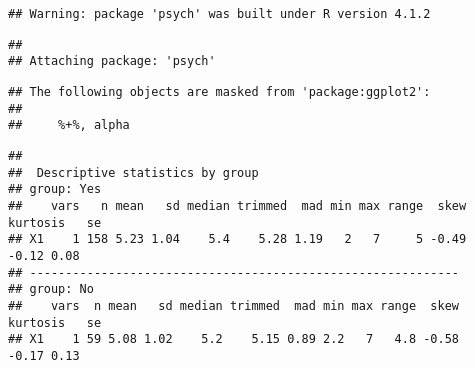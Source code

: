 \documentclass[
]{article}
\newenvironment{Shaded}{\begin{snugshade}}{\end{snugshade}}
\newcommand{\AttributeTok}[1]{\textcolor[rgb]{0.77,0.63,0.00}{#1}}
\newcommand{\CommentTok}[1]{\textcolor[rgb]{0.56,0.35,0.01}{\textit{#1}}}
\newcommand{\DecValTok}[1]{\textcolor[rgb]{0.00,0.00,0.81}{#1}}
\newcommand{\FunctionTok}[1]{\textcolor[rgb]{0.00,0.00,0.00}{#1}}
\newcommand{\NormalTok}[1]{#1}
\newcommand{\OtherTok}[1]{\textcolor[rgb]{0.56,0.35,0.01}{#1}}
\newcommand{\SpecialCharTok}[1]{\textcolor[rgb]{0.00,0.00,0.00}{#1}}
\newcommand{\StringTok}[1]{\textcolor[rgb]{0.31,0.60,0.02}{#1}}
\begin{document}
\begin{Shaded}
\end{Shaded}

\begin{verbatim}
## Warning: package 'psych' was built under R version 4.1.2
\end{verbatim}

\begin{verbatim}
## 
## Attaching package: 'psych'
\end{verbatim}

\begin{verbatim}
## The following objects are masked from 'package:ggplot2':
## 
##     %+%, alpha
\end{verbatim}

\begin{Shaded}
\end{Shaded}

\begin{verbatim}
## 
##  Descriptive statistics by group 
## group: Yes
##    vars   n mean   sd median trimmed  mad min max range  skew kurtosis   se
## X1    1 158 5.23 1.04    5.4    5.28 1.19   2   7     5 -0.49    -0.12 0.08
## ------------------------------------------------------------ 
## group: No
##    vars  n mean   sd median trimmed  mad min max range  skew kurtosis   se
## X1    1 59 5.08 1.02    5.2    5.15 0.89 2.2   7   4.8 -0.58    -0.17 0.13
\end{verbatim}
\end{document}
